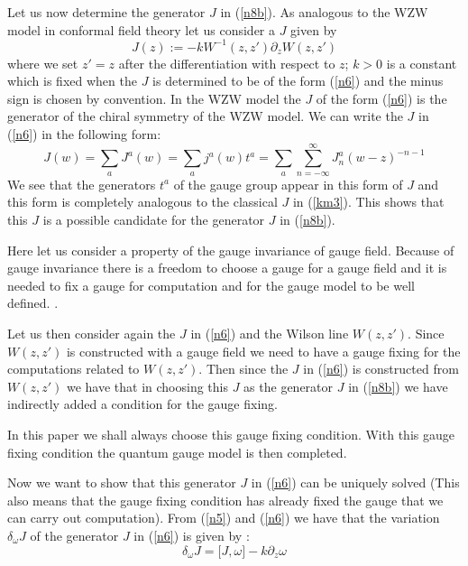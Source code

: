 \documentclass[a4paper,a4paper]{article}
\begin{document}
Let us now determine the generator $J$ in (\ref{n8b}).
As analogous to the WZW model in conformal field theory
\cite{Kni} \cite{Fra} let us consider a $J$ given by
\begin{equation}
J(z) := -k W^{-1}(z, z')\partial_z W(z, z')
\label{n6}
\end{equation}
where we set $z'=z$ after the differentiation
with respect to $z$; $ k>0 $ is a constant which is fixed when the $J$ is determined to be of the form (\ref{n6}) and the
minus sign is chosen by convention.
In the WZW model \cite{Kni}\cite{Fra}
 the $J$ of the form (\ref{n6})
is the  generator  of
the chiral symmetry of the WZW model. 
We can write the $J$ in (\ref{n6}) in the following form:
\begin{equation}
 J(w) = \sum_a J^a(w) = 
\sum_a j^a(w) t^a =
\sum_a
\sum_{n=-\infty}^{\infty}J_n^a (w-z)^{-n-1} 
\label{km8}
\end{equation}
We see that the generators $t^a$ of the gauge group appear
in this form of $J$ and  this form is
completely analogous to the classical $J$ in
(\ref{km3}). This shows that 
 this $J$ is a possible candidate for the generator
$J$ in (\ref{n8b}).

Here let us consider a property of the gauge invariance
of gauge field.
Because of gauge invariance there is a freedom to
choose a gauge for a gauge field and it is needed
to fix a gauge for  computation and for the gauge
model to be well defined.
\cite{Fad}. 

Let us then consider again the $J$ in (\ref{n6})
and the Wilson line $W(z,z')$. Since $W(z,z')$ is constructed
with a gauge field we need to have a gauge fixing
for the computations related to $W(z,z')$. Then since the
$J$ in (\ref{n6}) is constructed from $W(z,z')$
we have that in choosing this $J$ as the generator
$J$ in (\ref{n8b}) we have indirectly added a condition
for the gauge fixing. 

In this paper we shall always choose this gauge fixing condition.
With this gauge fixing condition the
quantum gauge model is then completed.


Now we want to show that this generator $J$ in (\ref{n6})
can be uniquely solved (This also means that the gauge fixing condition has already fixed the gauge that we can carry out computation).
From (\ref{n5}) and (\ref{n6}) we have that the variation $\delta_{\omega}J$
of the generator $J$ in (\ref{n6}) is given by
\cite{Fra}\cite{Kni}:
\begin{equation}
\delta_{\omega}J= \lbrack J, \omega\rbrack -k\partial_z \omega
\label{n8c}
\end{equation}
\end{document}
